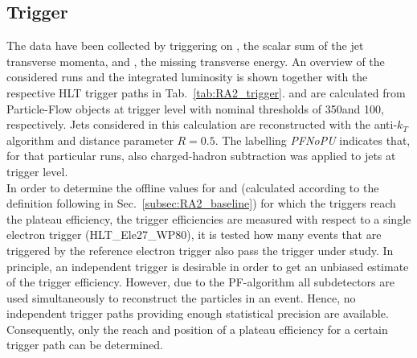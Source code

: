 \subsection{Trigger}
\label{subsec:RA2_trigger}
\begin{table}[!t]
\centering
\caption{Signal trigger paths used in different run ranges listed together with the integrated luminosity.}
\label{tab:RA2_trigger}
\end{table}  
The data have been collected by triggering on \HT, the scalar sum of the jet transverse momenta, and \met, the missing transverse energy. An overview of the considered runs and the integrated luminosity is shown together with the respective HLT trigger paths in Tab.~\ref{tab:RA2_trigger}. \HT and \met are calculated from Particle-Flow objects at trigger level with nominal thresholds of 350\gev and 100\gev, respectively. Jets considered in this calculation are reconstructed with the anti-$k_T$ algorithm and distance parameter $R = 0.5$. The labelling \textit{PFNoPU} indicates that, for that particular runs, also charged-hadron subtraction was applied to jets at trigger level. \\
In order to determine the offline values for \HT and \MHT (calculated according to the definition following in Sec.~\ref{subsec:RA2_baseline}) for which the triggers reach the plateau efficiency, the trigger efficiencies are measured with respect to a single electron trigger (HLT\_Ele27\_WP80), \ie it is tested how many events that are triggered by the reference electron trigger also pass the trigger under study. In principle, an independent trigger is desirable in order to get an unbiased estimate of the trigger efficiency. However, due to the PF-algorithm all subdetectors are used simultaneously to reconstruct the particles in an event. Hence, no independent trigger paths providing enough statistical precision are available. Consequently, only the reach and position of a plateau efficiency for a certain trigger path can be determined. \\
